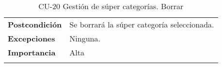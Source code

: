 \begin{longtable}[H]{@{}ll@{}}
\begin{minipage}[t]{0.23\columnwidth}\raggedright\strut
\textbf{Postcondición}\strut
\end{minipage} & \begin{minipage}[t]{0.71\columnwidth}\raggedright\strut
Se borrará la súper categoría seleccionada.\strut
\end{minipage}\tabularnewline
\begin{minipage}[t]{0.23\columnwidth}\raggedright\strut
\textbf{Excepciones}\strut
\end{minipage} & \begin{minipage}[t]{0.71\columnwidth}\raggedright\strut
Ninguna. \strut
\end{minipage}\tabularnewline
\begin{minipage}[t]{0.23\columnwidth}\raggedright\strut
\textbf{Importancia}\strut
\end{minipage} & \begin{minipage}[t]{0.71\columnwidth}\raggedright\strut
Alta\strut
\end{minipage}\tabularnewline
\bottomrule
\caption{CU-20 Gestión de súper categorías. Borrar}
\end{longtable}


